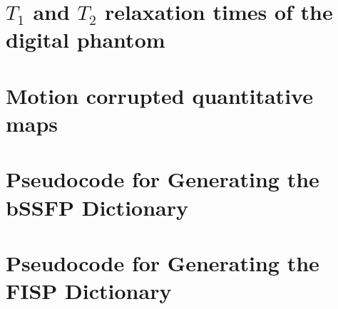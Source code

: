 \chapter{$T_1$ and $T_2$ relaxation times of the digital phantom}
\label{appendixlabelPhantom}
 

\chapter{Motion corrupted quantitative maps}
\label{appendixlabelMotion}


\chapter{Pseudocode for Generating the bSSFP Dictionary}
\label{appendixlabel1}
 
 




\chapter{Pseudocode for Generating the FISP Dictionary}
\label{appendixlabel2}
 


